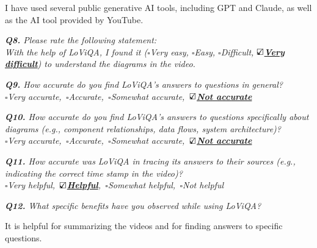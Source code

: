 
\begin{samepage}
\begin{mdframed}[style=MyFrame]
I have used several public generative AI tools, including GPT and Claude, as well as the AI tool provided by YouTube.
\end{mdframed}
\end{samepage}




\vspace*{1em}\noindent\textit{\textbf{Q8.} Please rate the following statement:
\\[.5em]
 \textit{With the help of LoViQA, I found it}
($\square$Very easy, $\square$Easy, $\square$Difficult, \underline{\bfseries$\text{\rlap{$\checkmark$}}\square$Very difficult})
to understand the diagrams in the video.
}


\vspace*{1em}\noindent\textit{\textbf{Q9.} How accurate do you find LoViQA's answers to questions in general?
\\[.5em]
        \indent$\square$Very accurate,\,
        $\square$Accurate,\,
        $\square$Somewhat accurate,\,
        \underline{\bfseries$\text{\rlap{$\checkmark$}}\square$Not accurate}
}



\vspace*{1em}\noindent\textit{\textbf{Q10.} How accurate do you find LoViQA's answers to questions specifically about diagrams (e.g., component relationships, data flows, system architecture)?
\\[.5em]
        \indent$\square$Very accurate,\,
        $\square$Accurate,\,
        $\square$Somewhat accurate,\,
        \underline{\bfseries$\text{\rlap{$\checkmark$}}\square$Not accurate}
}



\vspace*{1em}\noindent\textit{\textbf{Q11.} 
How accurate was LoViQA in tracing its answers to their sources
(e.g.,  indicating the correct time stamp in the video)?
\\[.5em]
\indent $\square$Very helpful,\,
\underline{\bfseries$\text{\rlap{$\checkmark$}}\square$Helpful},\,
$\square$Somewhat helpful,\,
$\square$Not helpful
}


\vspace*{1em}\noindent\textit{\textbf{Q12.} What specific benefits have you observed while using LoViQA?
}
\begin{samepage}
\begin{mdframed}[style=MyFrame]
It is helpful for summarizing the videos and for finding answers to specific questions.
\end{mdframed}
\end{samepage}


